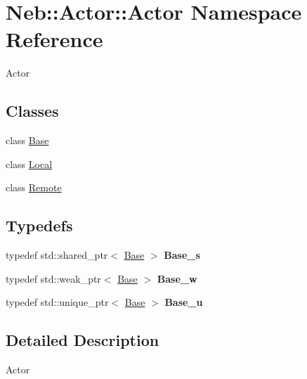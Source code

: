 \hypertarget{namespaceNeb_1_1Actor_1_1Actor}{\section{Neb\-:\-:Actor\-:\-:Actor Namespace Reference}
\label{namespaceNeb_1_1Actor_1_1Actor}
}


Actor  


\subsection*{Classes}
\begin{DoxyCompactItemize}
\item 
class \hyperlink{classNeb_1_1Actor_1_1Actor_1_1Base}{Base}
\item 
class \hyperlink{classNeb_1_1Actor_1_1Actor_1_1Local}{Local}
\item 
class \hyperlink{classNeb_1_1Actor_1_1Actor_1_1Remote}{Remote}
\end{DoxyCompactItemize}
\subsection*{Typedefs}
\begin{DoxyCompactItemize}
\item 
\hypertarget{namespaceNeb_1_1Actor_1_1Actor_a53b5f755b8288407a883ea0500140431}{typedef std\-::shared\-\_\-ptr$<$ \hyperlink{classNeb_1_1Actor_1_1Actor_1_1Base}{Base} $>$ {\bfseries Base\-\_\-s}}\label{namespaceNeb_1_1Actor_1_1Actor_a53b5f755b8288407a883ea0500140431}

\item 
\hypertarget{namespaceNeb_1_1Actor_1_1Actor_ac23dcb56f9ccaafd8dbc179e2465e25f}{typedef std\-::weak\-\_\-ptr$<$ \hyperlink{classNeb_1_1Actor_1_1Actor_1_1Base}{Base} $>$ {\bfseries Base\-\_\-w}}\label{namespaceNeb_1_1Actor_1_1Actor_ac23dcb56f9ccaafd8dbc179e2465e25f}

\item 
\hypertarget{namespaceNeb_1_1Actor_1_1Actor_a9e624fd535d52b994e6f99e5c8a7e34a}{typedef std\-::unique\-\_\-ptr$<$ \hyperlink{classNeb_1_1Actor_1_1Actor_1_1Base}{Base} $>$ {\bfseries Base\-\_\-u}}\label{namespaceNeb_1_1Actor_1_1Actor_a9e624fd535d52b994e6f99e5c8a7e34a}

\end{DoxyCompactItemize}


\subsection{Detailed Description}
Actor 